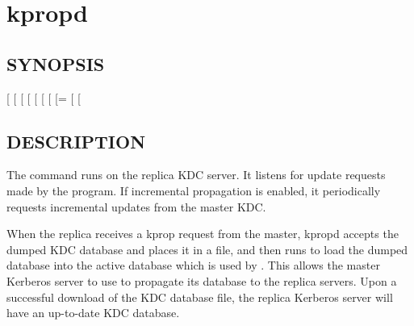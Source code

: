 \documentclass[letterpaper,10pt,english]{sphinxmanual}
\begin{document}
\section{kpropd}
\label{\detokenize{admin/admin_commands/kpropd::doc}}\label{\detokenize{admin/admin_commands/kpropd:kpropd}}\label{\detokenize{admin/admin_commands/kpropd:kpropd-8}}

\subsection{SYNOPSIS}
\label{\detokenize{admin/admin_commands/kpropd:synopsis}}
{[} \sphinxstyleemphasis{realm}{]}
{[} \sphinxstyleemphasis{admin\_server}{]}
{[} \sphinxstyleemphasis{acl\_file}{]}
{[} \sphinxstyleemphasis{replica\_dumpfile}{]}
{[} \sphinxstyleemphasis{principal\_database}{]}
{[} \sphinxstyleemphasis{kdb5\_util\_prog}{]}
{[} \sphinxstyleemphasis{port}{]}
{[}=\sphinxstyleemphasis{pid\_file}{]}
{[}\sphinxstylestrong{-d}{]}
{[}\sphinxstylestrong{-t}{]}


\subsection{DESCRIPTION}
\label{\detokenize{admin/admin_commands/kpropd:description}}
The  command runs on the replica KDC server.  It listens for
update requests made by the {\hyperref[\detokenize{admin/admin_commands/kprop:kprop-8}]{}} program.  If incremental
propagation is enabled, it periodically requests incremental updates
from the master KDC.

When the replica receives a kprop request from the master, kpropd
accepts the dumped KDC database and places it in a file, and then runs
{\hyperref[\detokenize{admin/admin_commands/kdb5_util:kdb5-util-8}]{}} to load the dumped database into the active
database which is used by {\hyperref[\detokenize{admin/admin_commands/krb5kdc:krb5kdc-8}]{}}.  This allows the master
Kerberos server to use {\hyperref[\detokenize{admin/admin_commands/kprop:kprop-8}]{}} to propagate its database to
the replica servers.  Upon a successful download of the KDC database
file, the replica Kerberos server will have an up-to-date KDC
database.
\end{document}
